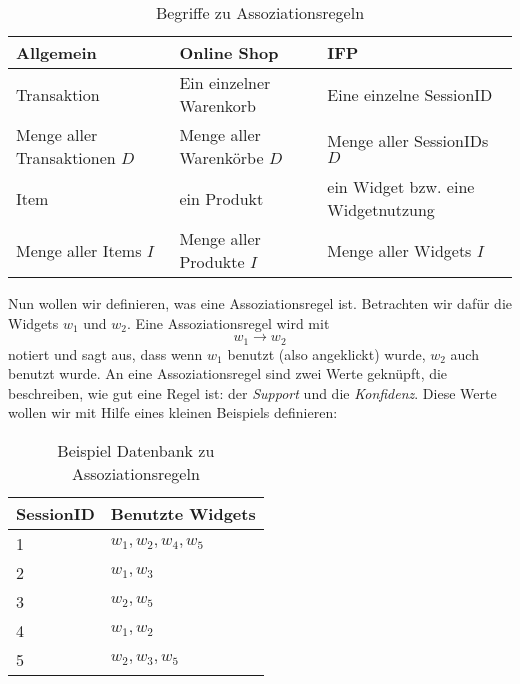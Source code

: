 \begin{table}[htb]
	\begin{center}
		\begin{tabular}{p{4cm}|l|p{5cm}}
			Allgemein & Online Shop & IFP\\
			\hline
			Transaktion & Ein einzelner Warenkorb & Eine einzelne SessionID\\
			\hline
			Menge aller Transaktionen $D$ & Menge aller Warenkörbe $D$ & Menge aller SessionIDs $D$\\
			\hline
			Item & ein Produkt & ein Widget bzw. eine Widgetnutzung\\
			\hline
			Menge aller Items $I$ & Menge aller Produkte $I$ & Menge aller Widgets $I$
		\end{tabular}
		\caption{Begriffe zu Assoziationsregeln}
		\label{tab:begriffe_ar}
	\end{center}
\end{table}

	Nun wollen wir definieren, was eine Assoziationsregel ist. Betrachten wir dafür die Widgets $w_1$ und $w_2$. Eine Assoziationsregel wird mit \begin{equation*}w_1 \rightarrow w_2\end{equation*} notiert und sagt aus, dass wenn $w_1$ benutzt (also angeklickt) wurde, $w_2$ auch benutzt wurde. An eine Assoziationsregel sind zwei Werte geknüpft, die beschreiben, wie \glqq gut\grqq{} eine Regel ist: der \textit{Support} und die \textit{Konfidenz}. Diese Werte wollen wir mit Hilfe eines kleinen Beispiels definieren:\\

		\begin{table}[htb]
	\begin{center}
		\begin{tabular}{|l|l|}
			\hline
			SessionID&Benutzte Widgets\\ \hline
			1& $w_1,w_2,w_4,w_5$\\ \hline
			2& $w_1,w_3$\\ \hline
			3& $w_2,w_5$\\ \hline
			4& $w_1,w_2$\\ \hline
			5& $w_2,w_3,w_5$\\ \hline
		\end{tabular}
		\caption{Beispiel Datenbank zu Assoziationsregeln}
		\label{tab:bsp_ar}
	\end{center}
\end{table}

